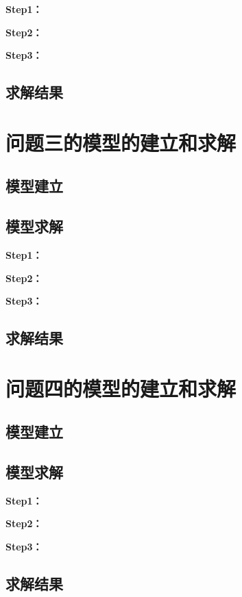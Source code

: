 \documentclass[withoutpreface,bwprint]{cumcmthesis}
\begin{document}
\textbf{Step1：} 

\textbf{Step2：} 

\textbf{Step3：} 

\subsection{求解结果}


\section{问题三的模型的建立和求解}
\subsection{模型建立}

\subsection{模型求解}

\textbf{Step1：} 

\textbf{Step2：} 

\textbf{Step3：} 

\subsection{求解结果}


\section{问题四的模型的建立和求解}
\subsection{模型建立}

\subsection{模型求解}

\textbf{Step1：} 

\textbf{Step2：} 

\textbf{Step3：} 

\subsection{求解结果}
\end{document}

